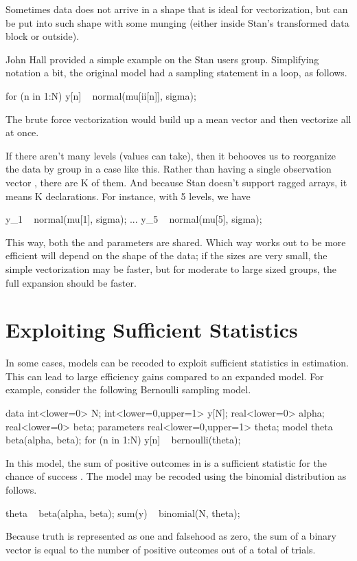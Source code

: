 Sometimes data does not arrive in a shape that is ideal for
vectorization, but can be put into such shape with some munging
(either inside Stan's transformed data block or outside).

John Hall provided a simple example on the Stan users group.
Simplifying notation a bit, the original model had a sampling
statement in a loop, as follows.
%
\begin{stancode}
for (n in 1:N)
  y[n] ~ normal(mu[ii[n]], sigma);
\end{stancode}
%
The brute force vectorization would build up a mean vector and then
vectorize all at once.
%
\begin{stancode}
{
  vector[N] mu_ii;
  for (n in 1:N)
    mu_ii[n] = mu[ii[n]];
  y ~ normal(mu_ii, sigma);
\end{stancode}
%
If there aren't many levels (values  can take), then it
behooves us to reorganize the data by group in a case like this.  
Rather than having a single observation vector , there are K of them.
And because Stan doesn't support ragged arrays, it means K
declarations.  For instance, with 5 levels, we have
%
\begin{stancode}
  y_1 ~ normal(mu[1], sigma);
  ...
  y_5 ~ normal(mu[5], sigma);
\end{stancode}
%
This way, both the  and  parameters are shared.
Which way works out to be more efficient will depend on the shape of
the data; if the sizes are very small, the simple vectorization may be
faster, but for moderate to large sized groups, the full expansion
should be faster.

\section{Exploiting Sufficient Statistics}

In some cases, models can be recoded to exploit sufficient statistics
in estimation.  This can lead to large efficiency gains compared to an
expanded model.  For example, consider the following Bernoulli
sampling model.
%
\begin{stancode}
data {
  int<lower=0> N;
  int<lower=0,upper=1> y[N];
  real<lower=0> alpha;
  real<lower=0> beta;
}
parameters {
  real<lower=0,upper=1> theta;
}
model {
  theta ~ beta(alpha, beta);
  for (n in 1:N) 
    y[n] ~ bernoulli(theta);
}
\end{stancode}
%
In this model, the sum of positive outcomes in  is a
sufficient statistic for the chance of success .  The
model may be recoded using the binomial distribution as follows.
%
\begin{stancode}
    theta ~ beta(alpha, beta);
    sum(y) ~ binomial(N, theta);
\end{stancode}
%
Because truth is represented as one and falsehood as zero, the sum
 of a binary vector  is equal to the number of
positive outcomes out of a total of  trials.  


